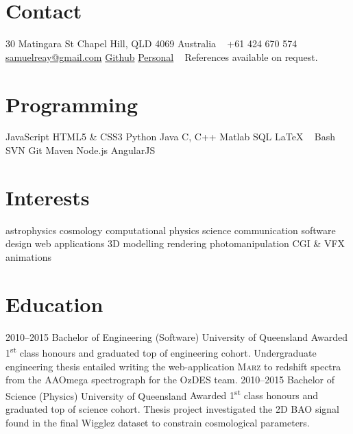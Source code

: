 \documentclass[]{friggeri-cv} %
\begin{document}


\begin{aside} %
\section{Contact}
30 Matingara St
Chapel Hill, QLD 4069
Australia
~
+61 424 670 574
~
\href{mailto:samuelreay@gmail.com}{samuelreay@gmail.com}
\href{https://github.com/samreay}{Github}
\href{https://Samreay.github.io}{Personal}
~
References available on request.
~
\section{Programming}
JavaScript
HTML5 \& CSS3
Python
Java 
C, C++
Matlab
SQL 
LaTeX
~
Bash
SVN
Git
Maven
Node.js
AngularJS
~
\section{Interests}
astrophysics
cosmology 
 computational physics 
  science communication 
   software design 
    web applications 
     3D modelling 
      rendering 
       photomanipulation 
        CGI \& VFX
        animations
\end{aside}



\section{Education}

\begin{entrylist}
\entry
{2010--2015}
{Bachelor of Engineering {\normalfont (Software)}}
{University of Queensland}
{Awarded 1\textsuperscript{st} class honours and graduated top of engineering cohort. Undergraduate engineering thesis entailed writing the web-application \textsc{Marz} to redshift spectra from the AAOmega spectrograph for the OzDES team. }
\entry
{2010--2015}
{Bachelor of Science {\normalfont (Physics)}}
{University of Queensland}
{Awarded 1\textsuperscript{st} class honours and graduated top of science cohort. Thesis project investigated the 2D BAO signal found in the final Wigglez dataset to constrain cosmological parameters.}
\end{entrylist}
\end{document}
